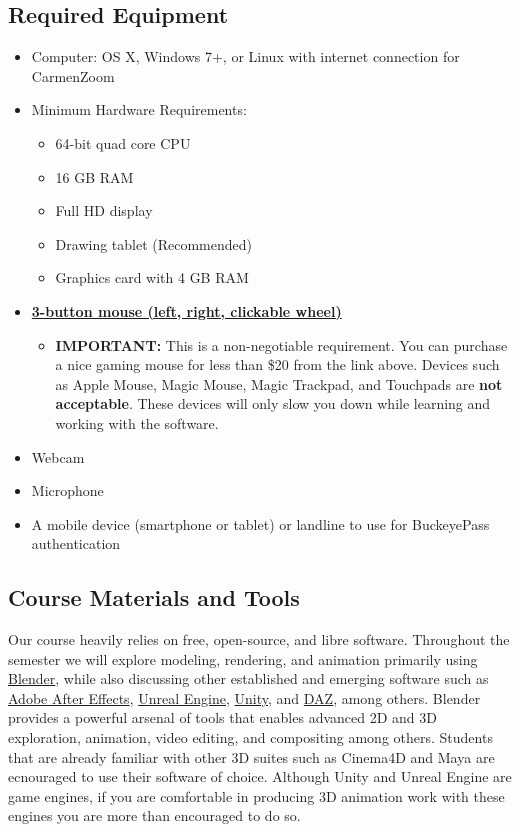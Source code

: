 \subsection{Required Equipment}

\begin{itemize}
      \tightlist
      \item Computer: OS X, Windows 7+, or Linux with internet connection for CarmenZoom
      \item Minimum Hardware Requirements:
            \begin{itemize}
                  \item 64-bit quad core CPU
                  \item 16 GB RAM
                  \item Full HD display
                  \item Drawing tablet (Recommended)
                  \item Graphics card with 4 GB RAM
            \end{itemize}
      \item \href{https://amzn.to/3hS2k9K}{\textbf{3-button mouse (left, right, clickable wheel)}}
            \begin{itemize}
                  \tightlist
                  \item \textbf{IMPORTANT:} This is a non-negotiable requirement. You can purchase a nice gaming mouse for less than \$20 from the link above. Devices such as Apple Mouse, Magic Mouse, Magic Trackpad, and Touchpads are \textbf{not acceptable}. These devices will only slow you down while learning and working with the software.
            \end{itemize}
      \item Webcam
      \item Microphone
      \item A mobile device (smartphone or tablet) or landline to use for BuckeyePass authentication
\end{itemize}

\subsection{Course Materials and Tools}

Our course heavily relies on free, open-source, and libre software. Throughout the semester we will explore modeling, rendering, and animation primarily using \href{http://blender.org/}{Blender}, while also discussing other established and emerging software such as \href{https://www.adobe.com/products/aftereffects.html}{Adobe After Effects}, \href{https://www.unrealengine.com/en-US/}{Unreal Engine}, \href{https://unity.com/}{Unity}, and \href{https://www.daz3d.com/}{DAZ}, among others. Blender provides a powerful arsenal of tools that enables advanced 2D and 3D exploration, animation, video editing, and compositing among others. Students that are already familiar with other 3D suites such as Cinema4D and Maya are ecnouraged to use their software of choice. Although Unity and Unreal Engine are game engines, if you are comfortable in producing 3D animation work with these engines you are more than encouraged to do so.


